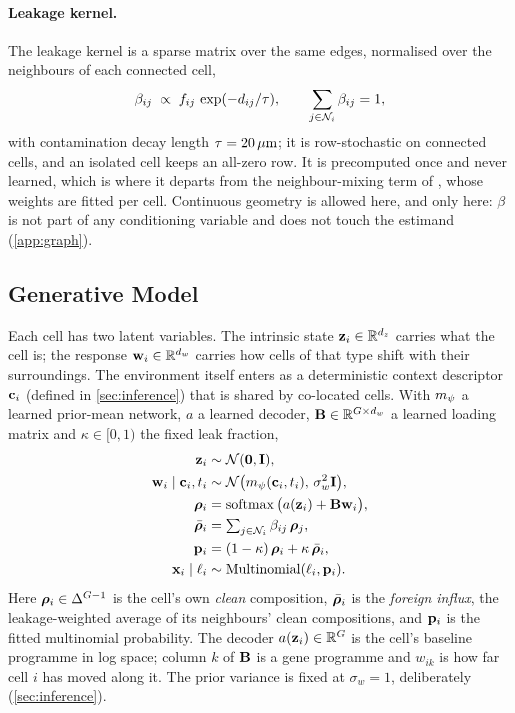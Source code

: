 \paragraph{Leakage kernel.}
The leakage kernel is a sparse matrix over the same edges, normalised over the neighbours of each connected cell,
\begin{equation}
  \beta_{ij} \;\propto\; f_{ij}\,\exp(-d_{ij}/\tau), \qquad \sum_{j \in \mathcal{N}_{i}} \beta_{ij} = 1,
  \label{eq:beta}
\end{equation}
with contamination decay length $\tau = 20\,\mu\text{m}$; it is row-stochastic on connected cells, and an isolated cell keeps an all-zero row. It is precomputed once and never learned, which is where it departs from the neighbour-mixing term of \citet{ergen2025}, whose weights are fitted per cell. Continuous geometry is allowed here, and only here: $\beta$ is not part of any conditioning variable and does not touch the estimand (\cref{app:graph}).

\subsection{Generative Model}
\label{sec:generative}

Each cell has two latent variables. The intrinsic state $\mathbf{z}_i \in \mathbb{R}^{d_z}$ carries what the cell is; the response $\mathbf{w}_i \in \mathbb{R}^{d_w}$ carries how cells of that type shift with their surroundings. The environment itself enters as a deterministic context descriptor $\mathbf{c}_i$ (defined in \cref{sec:inference}) that is shared by co-located cells. With $m_{\psi}$ a learned prior-mean network, $a$ a learned decoder, $\mathbf{B} \in \mathbb{R}^{G \times d_w}$ a learned loading matrix and $\kappa \in [0,1)$ the fixed leak fraction,
\begin{align}
  \mathbf{z}_i &\sim \mathcal{N}(\mathbf{0}, \mathbf{I}), \label{eq:gen-z}\\
  \mathbf{w}_i \mid \mathbf{c}_i, t_i &\sim \mathcal{N}\big(m_{\psi}(\mathbf{c}_i, t_i),\, \sigma_w^2 \mathbf{I}\big), \label{eq:gen-w}\\
  \boldsymbol{\rho}_i &= \operatorname{softmax}\big(a(\mathbf{z}_i) + \mathbf{B}\mathbf{w}_i\big), \label{eq:gen-rho}\\
  \bar{\boldsymbol{\rho}}_i &= \textstyle\sum_{j \in \mathcal{N}_{i}} \beta_{ij}\, \boldsymbol{\rho}_j, \label{eq:gen-rhobar}\\
  \mathbf{p}_i &= (1-\kappa)\, \boldsymbol{\rho}_i + \kappa\, \bar{\boldsymbol{\rho}}_i, \label{eq:gen-p}\\
  \mathbf{x}_i \mid \ell_i &\sim \operatorname{Multinomial}(\ell_i, \mathbf{p}_i). \label{eq:gen-x}
\end{align}
Here $\boldsymbol{\rho}_i \in \Delta^{G-1}$ is the cell's own \emph{clean} composition, $\bar{\boldsymbol{\rho}}_i$ is the \emph{foreign influx}, the leakage-weighted average of its neighbours' clean compositions, and $\mathbf{p}_i$ is the fitted multinomial probability. The decoder $a(\mathbf{z}_i) \in \mathbb{R}^G$ is the cell's baseline programme in log space; column $k$ of $\mathbf{B}$ is a gene programme and $w_{ik}$ is how far cell $i$ has moved along it. The prior variance is fixed at $\sigma_w = 1$, deliberately (\cref{sec:inference}).

